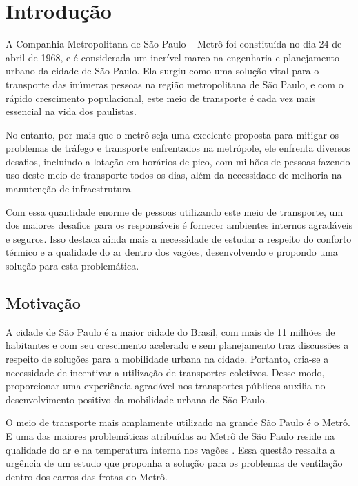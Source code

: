 \documentclass[acronym,symbols]{fei}
\begin{document}



\listoffigures
\tableofcontents

\chapter{Introdução}

A Companhia Metropolitana de São Paulo – Metrô foi constituída no dia 24 de abril de 1968, e é considerada um incrível marco na engenharia e planejamento urbano da cidade de São Paulo. Ela surgiu como uma solução vital para o transporte das inúmeras pessoas na região metropolitana de São Paulo, e com o rápido crescimento populacional, este meio de transporte é cada vez mais essencial na vida dos paulistas. 

No entanto, por mais que o metrô seja uma excelente proposta para mitigar os problemas de tráfego e transporte enfrentados na metrópole, ele enfrenta diversos desafios, incluindo a lotação em horários de pico, com milhões de pessoas fazendo uso deste meio de transporte todos os dias, além da necessidade de melhoria na manutenção de infraestrutura.

Com essa quantidade enorme de pessoas utilizando este meio de transporte, um dos maiores desafios para os responsáveis é fornecer ambientes internos agradáveis e seguros. Isso destaca ainda mais a necessidade de estudar a respeito do conforto térmico e a qualidade do ar dentro dos vagões, desenvolvendo e propondo uma solução para esta problemática.

\section{Motivação}

A cidade de São Paulo é a maior cidade do Brasil, com mais de 11 milhões de habitantes \cite{IBGE} e com seu crescimento acelerado e sem planejamento traz discussões a respeito de soluções para a mobilidade urbana na cidade. Portanto, cria-se a necessidade de incentivar a utilização de transportes coletivos. Desse modo, proporcionar uma experiência agradável nos transportes públicos auxilia no desenvolvimento positivo da mobilidade urbana de São Paulo.

O meio de transporte mais amplamente utilizado na grande São Paulo é o Metrô. E uma das maiores problemáticas atribuídas ao Metrô de São Paulo reside na qualidade do ar e na temperatura interna nos vagões \cite{MetroSP}. 
Essa questão ressalta a urgência de um estudo que proponha a solução para os problemas de ventilação dentro dos carros das frotas do Metrô.
\end{document}
